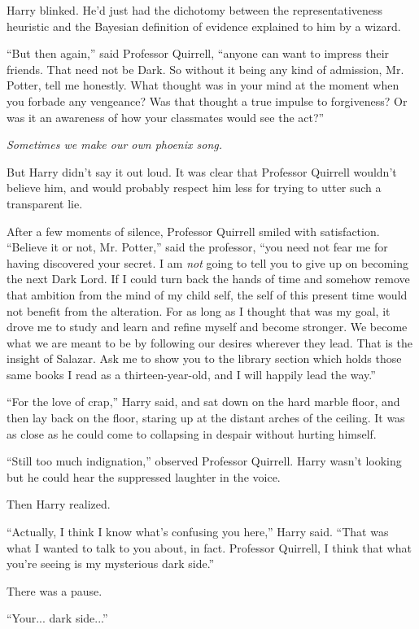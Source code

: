 Harry blinked. He'd just had the dichotomy between the
representativeness heuristic and the Bayesian definition of evidence
explained to him by a wizard.

``But then again,'' said Professor Quirrell, ``anyone can want to
impress their friends. That need not be Dark. So without it being any
kind of admission, Mr. Potter, tell me honestly. What thought was in
your mind at the moment when you forbade any vengeance? Was that thought
a true impulse to forgiveness? Or was it an awareness of how your
classmates would see the act?''

\emph{Sometimes we make our own phoenix song.}

But Harry didn't say it out loud. It was clear that Professor Quirrell
wouldn't believe him, and would probably respect him less for trying to
utter such a transparent lie.

After a few moments of silence, Professor Quirrell smiled with
satisfaction. ``Believe it or not, Mr. Potter,'' said the professor,
``you need not fear me for having discovered your secret. I am \emph{not}
going to tell you to give up on becoming the next Dark Lord. If I could
turn back the hands of time and somehow remove that ambition from the
mind of my child self, the self of this present time would not benefit
from the alteration. For as long as I thought that was my goal, it drove
me to study and learn and refine myself and become stronger. We become
what we are meant to be by following our desires wherever they lead.
That is the insight of Salazar. Ask me to show you to the library
section which holds those same books I read as a thirteen-year-old, and
I will happily lead the way.''

``For the love of crap,'' Harry said, and sat down on the hard marble
floor, and then lay back on the floor, staring up at the distant arches
of the ceiling. It was as close as he could come to collapsing in
despair without hurting himself.

``Still too much indignation,'' observed Professor Quirrell. Harry
wasn't looking but he could hear the suppressed laughter in the voice.

Then Harry realized.

``Actually, I think I know what's confusing you here,'' Harry said.
``That was what I wanted to talk to you about, in fact. Professor
Quirrell, I think that what you're seeing is my mysterious dark side.''

There was a pause.

``Your... dark side...''

